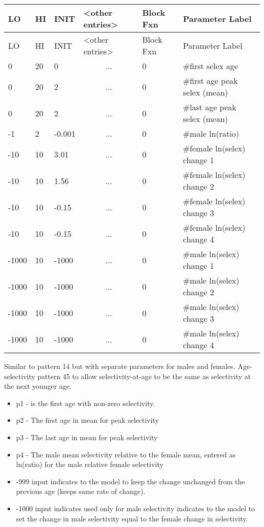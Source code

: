 	\begin{longtable}{p{1cm} p{1cm} p{1cm} p{2.9cm} p{1.8cm} p{5.1cm}}
		\hline
		LO \Tstrut & HI & INIT & <other entries> & Block Fxn & Parameter Label \Bstrut\\
		\hline
		\endfirsthead
	
		\hline
		LO \Tstrut & HI & INIT & <other entries> & Block Fxn & Parameter Label \Bstrut\\
		\hline
		\endhead

		0     & 20 &  0     & \multicolumn{1}{c}{...} & 0 & \#first selex age \Tstrut\\
		0     & 20 &  2     & \multicolumn{1}{c}{...} & 0 & \#first age peak selex (mean) \\
		0     & 20 &  2     & \multicolumn{1}{c}{...} & 0 & \#last age peak selex (mean) \\
		-1    & 2  & -0.001 & \multicolumn{1}{c}{...} & 0 & \#male ln(ratio) \\
		-10   & 10 &  3.01  & \multicolumn{1}{c}{...} & 0 & \#female ln(selex) change 1 \\
		-10   & 10 &  1.56  & \multicolumn{1}{c}{...} & 0 & \#female ln(selex) change 2 \\
		-10   & 10 & -0.15  & \multicolumn{1}{c}{...} & 0 & \#female ln(selex) change 3 \\
		-10   & 10 & -0.15  & \multicolumn{1}{c}{...} & 0 & \#female ln(selex) change 4 \\
		-1000 & 10 & -1000  & \multicolumn{1}{c}{...} & 0 & \#male ln(selex) change 1 \\
		-1000 & 10 & -1000  & \multicolumn{1}{c}{...} & 0 & \#male ln(selex) change 2 \\
		-1000 & 10 & -1000  & \multicolumn{1}{c}{...} & 0 & \#male ln(selex) change 3 \\
		-1000 & 10 & -1000  & \multicolumn{1}{c}{...} & 0 & \#male ln(selex) change 4 \Bstrut\\
		\hline
	\end{longtable}
		
Similar to pattern 14 but with separate parameters for males and females. Age-selectivity pattern 45 to allow selectivity-at-age to be the same as selectivity at the next younger age.
	\begin{itemize}
		\item p1 - is the first age with non-zero selectivity.
		\item p2 - The first age in mean for peak selectivity
		\item p3 - The last age in mean for peak selectivity
		\item p4 - The male mean selectivity relative to the female mean, entered as ln(ratio) for the male relative female selectivity
		\item -999 input indicates to the model to keep the change unchanged from the previous age (keeps same rate of change).
		\item -1000 input indicates used only for male selectivity indicates to the model to set the change in male selectivity equal to the female change in selectivity.
	\end{itemize}
		
